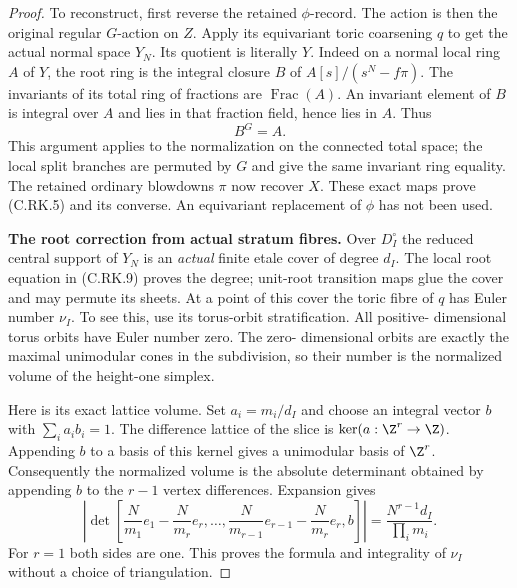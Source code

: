 \begin{proof}
To reconstruct, first reverse
the retained $\phi$-record.
The action is then the original
regular $G$-action on $Z$.
Apply its equivariant toric
coarsening $q$ to get the actual
normal space $Y_N$. Its quotient
is literally $Y$. Indeed on a
normal local ring $A$ of $Y$,
the root ring is the integral
closure $B$ of
$A[s]/(s^N-f\pi)$. The invariants
of its total ring of fractions are
$\operatorname{Frac}(A)$.
An invariant element of $B$ is
integral over $A$ and lies in
that fraction field, hence lies
in $A$. Thus
\[
                              B^G=A.
\tag{C.RK.14}
\]
This argument applies to the
normalization on the connected
total space; the local split
branches are permuted by $G$
and give the same invariant
ring equality. The retained
ordinary blowdowns $\pi$ now
recover $X$. These exact maps
prove (C.RK.5) and its converse.
An equivariant replacement of
$\phi$ has not been used.

\par\medskip\noindent\textbf{The root correction from actual stratum fibres.}
Over $D_I^\circ$ the reduced
central support of $Y_N$ is an
\emph{actual} finite etale cover
of degree $d_I$. The local root
equation in (C.RK.9) proves the
degree; unit-root transition
maps glue the cover and may
permute its sheets. At a point
of this cover the toric fibre
of $q$ has Euler number $\nu_I$.
To see this, use its torus-orbit
stratification. All positive-
dimensional torus orbits have
Euler number zero. The zero-
dimensional orbits are exactly
the maximal unimodular cones
in the subdivision, so their
number is the normalized
volume of the height-one
simplex.

Here is its exact lattice
volume. Set $a_i=m_i/d_I$ and
choose an integral vector $b$
with $\sum_i a_i b_i=1$.
The difference lattice of
the slice is
$\ker(a:\Z^r\to\Z)$.
Appending $b$ to a basis of
this kernel gives a unimodular
basis of $\Z^r$. Consequently
the normalized volume is the
absolute determinant obtained
by appending $b$ to the $r-1$
vertex differences. Expansion
gives
\[
 \left|\det\left[
 \frac{N}{m_1}e_1-\frac{N}{m_r}e_r,
 \ldots,
 \frac{N}{m_{r-1}}e_{r-1}-\frac{N}{m_r}e_r,
 b\right]\right|
               =\frac{N^{r-1}d_I}{\prod_i m_i}.
\tag{C.RK.15}
\]
For $r=1$ both sides are one.
This proves the formula and
integrality of $\nu_I$ without
a choice of triangulation.


\end{proof}
